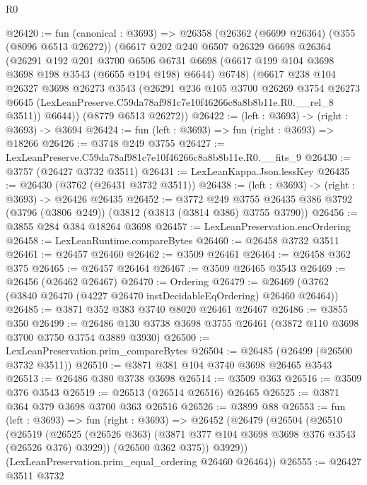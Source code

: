 \begin{lexlean}{R0}
\begin{coremodule}
@26420 := fun (canonical : @3693) =>
  @26358
    (@26362
      (@6699 @26364)
      (@355 (@8096 @6513 @26272))
      (@6617
        @202
        @240
        @6507
        @26329
        @6698
        @26364
        (@26291
          @192
          @201
          @3700
          @6506
          @6731
          @6698
          (@6617 @199 @104 @3698 @3698 @198 @3543 (@6655 @194 @198) @6644)
          @6748)
        (@6617
          @238
          @104
          @26327
          @3698
          @26273
          @3543
          (@26291
            @236
            @105
            @3700
            @26269
            @3754
            @26273
            @6645
            (LexLeanPreserve.C59da78af981c7e10f46266c8a8b8b11e.R0.__rel_8 @3511))
          @6644))
      (@8779 @6513 @26272))
@26422 := (left : @3693) -> (right : @3693) -> @3694
@26424 := fun (left : @3693) => fun (right : @3693) => @18266
@26426 := @3748 @249 @3755
@26427 := LexLeanPreserve.C59da78af981c7e10f46266c8a8b8b11e.R0.__fits_9
@26430 := @3757 (@26427 @3732 @3511)
@26431 := LexLeanKappa.Json.lessKey
@26435 := @26430 (@3762 (@26431 @3732 @3511))
@26438 := (left : @3693) -> (right : @3693) -> @26426 @26435
@26452 := @3772
    @249
    @3755
    @26435
    @386
    @3792
    (@3796 (@3806 @249))
    (@3812 (@3813 (@3814 @386) @3755 @3790))
@26456 := @3855 @284 @384 @18264 @3698
@26457 := LexLeanPreservation.encOrdering
@26458 := LexLeanRuntime.compareBytes
@26460 := @26458 @3732 @3511
@26461 := @26457 @26460
@26462 := @3509 @26461
@26464 := @26458 @362 @375
@26465 := @26457 @26464
@26467 := @3509 @26465 @3543
@26469 := @26456 (@26462 @26467)
@26470 := Ordering
@26479 := @26469 (@3762 (@3840 @26470 (@4227 @26470 instDecidableEqOrdering) @26460 @26464))
@26485 := @3871 @352 @383 @3740 @8020 @26461 @26467
@26486 := @3855 @350
@26499 := @26486 @130 @3738 @3698 @3755 @26461 (@3872 @110 @3698 @3700 @3750 @3754 @3889 @3930)
@26500 := LexLeanPreservation.prim_compareBytes
@26504 := @26485 (@26499 (@26500 @3732 @3511))
@26510 := @3871 @381 @104 @3740 @3698 @26465 @3543
@26513 := @26486 @380 @3738 @3698
@26514 := @3509 @363
@26516 := @3509 @376 @3543
@26519 := @26513 (@26514 @26516) @26465
@26525 := @3871 @364 @379 @3698 @3700 @363 @26516
@26526 := @3899 @88
@26553 := fun (left : @3693) =>
  fun (right : @3693) =>
  @26452
    (@26479
      (@26504
        (@26510
          (@26519
            (@26525 (@26526 @363) (@3871 @377 @104 @3698 @3698 @376 @3543 (@26526 @376) @3929))
            (@26500 @362 @375))
          @3929))
      (LexLeanPreservation.prim_equal_ordering @26460 @26464))
@26555 := @26427 @3511 @3732

\end{coremodule}
\end{lexlean}
